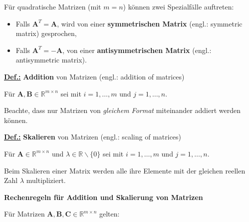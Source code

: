 \medskip
\noindent
F\"ur quadratische Matrizen (mit $m=n$) k\"onnen zwei
Spezialf\"alle auftreten:
%
\begin{itemize}
	\item Falls $\mathbf{A}^{T}=\mathbf{A}$, wird von einer
	{\bf symmetrischen Matrix} (engl.: symmetric matrix) gesprochen,
	\item Falls $\mathbf{A}^{T}=-\mathbf{A}$, von einer
	{\bf antisymmetrischen Matrix} (engl.: antisymmetric matrix).
\end{itemize}
%

\medskip
\noindent
\underline{\bf Def.:}
{\bf Addition} von Matrizen (engl.: addition of matrices)

\noindent
F\"ur $\mathbf{A}, \mathbf{B} \in \mathbb{R}^{m \times n}$
sei
%
\be
{}
\ee
%
mit $i=1,\ldots,m$ und $j=1,\ldots,n$.

\medskip
\noindent
Beachte, dass nur Matrizen von {\em gleichem Format\/}
miteinander addiert werden k\"onnen.

\pagebreak
\medskip
\noindent
\underline{\bf Def.:}
{\bf Skalieren} von Matrizen (engl.: scaling of matrices)

\noindent
F\"ur $\mathbf{A} \in \mathbb{R}^{m \times n}$
und $\lambda \in \mathbb{R}\backslash \{0\}$ sei
%
\be
{}
\ee
%
mit $i=1,\ldots,m$ und $j=1,\ldots,n$.

\medskip
\noindent
Beim Skalieren einer Matrix werden alle ihre Elemente
mit der gleichen reellen Zahl $\lambda$ multipliziert.

\medskip
\noindent
{\bf Rechenregeln f\"ur Addition und Skalierung
von Matrizen}

\noindent
F\"{u}r Matrizen $\mathbf{A}, \mathbf{B}, \mathbf{C}
\in \mathbb{R}^{m \times n}$ gelten:

